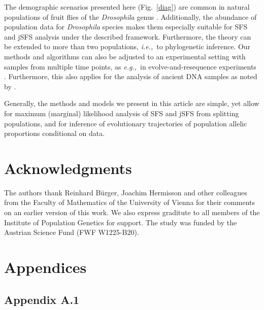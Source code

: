 \documentclass[preprint]{elsarticle}
\newcommand\eg{{\it e.g.,}}
\newcommand\ie{{\it i.e.,}}
\begin{document}
The demographic scenarios presented here (Fig.~\ref{diag}) are common in natural populations of fruit flies of the \textit{Drosophila} genus \citep[\eg][]{Li06,Zeng10a,Pool12}. Additionally, the abundance of population data for \textit{Drosophila} species makes them especially suitable for SFS and jSFS analysis under the described framework. Furthermore, the theory can be extended to more than two populations, \ie\ to phylogenetic inference. Our methods and algorithms can also be adjusted to an experimental setting with samples from multiple time points, as \eg\ in evolve-and-resequence experiments \citep{Kofl14}. Furthermore, this also applies for the analysis of ancient DNA samples as noted by \citet{Stei14}.%

Generally, the methods and models we present in this article are simple, yet allow for maximum (marginal) likelihood analysis of SFS and jSFS from splitting populations, and for inference of evolutionary trajectories of population allelic proportions conditional on data. 

\section*{Acknowledgments}

The authors thank Reinhard B\"urger, Joachim Hermisson and other colleagues from the Faculty of Mathematics of the University of Vienna for their comments on an earlier version of this work. We also express graditute to all members of the Institute of Population Genetics for support. The study was funded by the Austrian Science Fund (FWF W1225-B20). %

\section{Appendices}
\subsection{Appendix A.1}\label{section:Greens_function}
\end{document}
